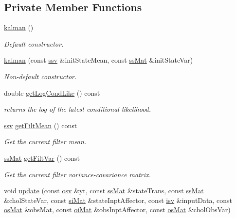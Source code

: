 \subsection*{Private Member Functions}
\begin{DoxyCompactItemize}
\item 
\hyperlink{classkalman_a49b1033618a41c0c426f9d177863e255}{kalman} ()
\begin{DoxyCompactList}\small\item\em Default constructor. \end{DoxyCompactList}\item 
\hyperlink{classkalman_a454f7ee7eff470d1e61d1deb3f10aff4}{kalman} (const \hyperlink{classkalman_a12e789b80f9b1e17cecdf93c32cc35ed}{ssv} \&init\+State\+Mean, const \hyperlink{classkalman_a9d46100ff92b06fad10f14d722a5ce94}{ss\+Mat} \&init\+State\+Var)
\begin{DoxyCompactList}\small\item\em Non-\/default constructor. \end{DoxyCompactList}\item 
double \hyperlink{classkalman_a1dc89cc6ecba5d4b881cabb830b12140}{get\+Log\+Cond\+Like} () const 
\begin{DoxyCompactList}\small\item\em returns the log of the latest conditional likelihood. \end{DoxyCompactList}\item 
\hyperlink{classkalman_a12e789b80f9b1e17cecdf93c32cc35ed}{ssv} \hyperlink{classkalman_a810da7b094b44bb8a83b5a567950cef3}{get\+Filt\+Mean} () const 
\begin{DoxyCompactList}\small\item\em Get the current filter mean. \end{DoxyCompactList}\item 
\hyperlink{classkalman_a9d46100ff92b06fad10f14d722a5ce94}{ss\+Mat} \hyperlink{classkalman_ae4d1c49849998372c87a3a9565c49d44}{get\+Filt\+Var} () const 
\begin{DoxyCompactList}\small\item\em Get the current filter variance-\/covariance matrix. \end{DoxyCompactList}\item 
void \hyperlink{classkalman_a551a248f9e836da3dd1ed2ae6d987ad3}{update} (const \hyperlink{classkalman_a59427bc89132911a2afb9f42ebff0b28}{osv} \&yt, const \hyperlink{classkalman_a9d46100ff92b06fad10f14d722a5ce94}{ss\+Mat} \&state\+Trans, const \hyperlink{classkalman_a9d46100ff92b06fad10f14d722a5ce94}{ss\+Mat} \&chol\+State\+Var, const \hyperlink{classkalman_a8311e2213ec968dc595add5f6933d091}{si\+Mat} \&state\+Inpt\+Affector, const \hyperlink{classkalman_ab085cc62231ff087133f8b24e052a36e}{isv} \&input\+Data, const \hyperlink{classkalman_a092ff444bcb70f49972e645bc993fd79}{os\+Mat} \&obs\+Mat, const \hyperlink{classkalman_a2a9c411927e8ae35144b2c40dac2f3d1}{oi\+Mat} \&obs\+Inpt\+Affector, const \hyperlink{classkalman_a092ff444bcb70f49972e645bc993fd79}{os\+Mat} \&chol\+Obs\+Var)

\end{DoxyCompactItemize}
